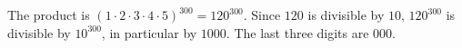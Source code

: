 The product is $(1\cdot2\cdot3\cdot4\cdot5)^{300}=120^{300}$. Since $120$ is divisible by $10$, $120^{300}$ is divisible by $10^{300}$, in particular by $1000$. The last three digits are $\boxed{000}$.
